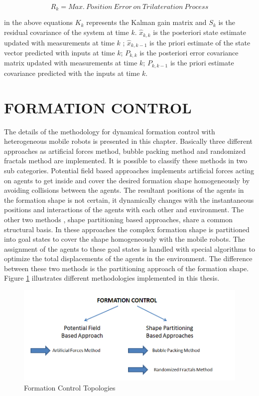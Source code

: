 \begin{equation}
R_k = Max.\ Position\ Error\ on\ Trilateration\ Process
\end{equation}
		
in the above equations $K_k$ represents the Kalman gain matrix and $S_k$ is the residual covariance of the system at time $k$. $\hat{x}_{k,k}$ is the posteriori state estimate updated with measurements at time $k$ ;  $\hat{x}_{k,k-1}$ is the priori estimate of the state vector predicted with inputs at time $k$; $P_{k,k}$ is the posteriori error covariance matrix updated with measurements at time $k$; $P_{k,k-1}$ is the priori estimate covariance predicted with the inputs at time $k$.
			
\section{FORMATION CONTROL} \label{formation_control_ref}
The details of the methodology for dynamical formation control with heterogeneous mobile robots is presented in this chapter. Basically three different approaches as artificial forces method, bubble packing method and randomized fractals method are implemented. It is possible to classify these methods in two sub categories. Potential field based approaches implements artificial forces acting on agents to get inside and cover the desired formation shape homogeneously by avoiding collisions between the agents. The resultant positions of the agents in the formation shape is not certain, it dynamically changes with the instantaneous positions and interactions of the agents with each other and environment. The other two methods , shape partitioning based approaches, share a common structural basis. In these approaches the complex formation shape is partitioned into goal states to cover the shape homogeneously with the mobile robots. The assignment of the agents to these goal states is handled with special algorithms to optimize the total displacements of the agents in the environment. The difference between these two methods is the partitioning approach of the formation shape. Figure \ref{formation_controlin_figi} illustrates different methodologies implemented in this thesis.
		
\begin{figure}[H]
\caption{Formation Control Topologies} \label{formation_controlin_figi}
\centering
\includegraphics[scale = 0.60]{methods}
\end{figure}		
		

